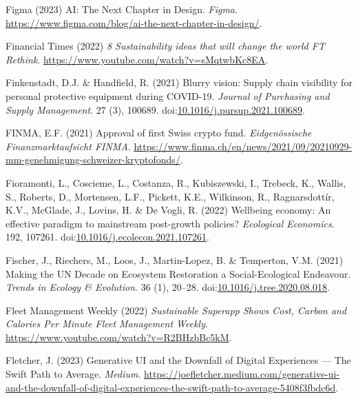 \documentclass[
  letterpaper,
  DIV=11,
  numbers=noendperiod]{scrartcl}
\newlength{\cslhangindent}
\newenvironment{CSLReferences}[2] %
 {\begin{list}{}{%
  \setlength{\itemindent}{0pt}
  \setlength{\leftmargin}{0pt}
  \setlength{\parsep}{0pt}
  \ifodd #1
   \setlength{\leftmargin}{\cslhangindent}
   \setlength{\itemindent}{-1\cslhangindent}
  \fi
  \setlength{\itemsep}{#2\baselineskip}}}
 {\end{list}}
\begin{document}
\begin{CSLReferences}{0}{1}
Figma (2023) {AI}: {The Next Chapter} in {Design}. \emph{Figma}.
\url{https://www.figma.com/blog/ai-the-next-chapter-in-design/}.

Financial Times (2022) \emph{8 {Sustainability} ideas that will change
the world {\textbar} {FT Rethink}}.
\url{https://www.youtube.com/watch?v=sMqtwbKc8EA}.

Finkenstadt, D.J. \& Handfield, R. (2021) Blurry vision: {Supply} chain
visibility for personal protective equipment during {COVID-19}.
\emph{Journal of Purchasing and Supply Management}. 27 (3), 100689.
doi:\href{https://doi.org/10.1016/j.pursup.2021.100689}{10.1016/j.pursup.2021.100689}.

FINMA, E.F. (2021) Approval of first {Swiss} crypto fund.
\emph{Eidgen{ö}ssische Finanzmarktaufsicht FINMA}.
\url{https://www.finma.ch/en/news/2021/09/20210929-mm-genehmigung-schweizer-kryptofonds/}.

Fioramonti, L., Coscieme, L., Costanza, R., Kubiszewski, I., Trebeck,
K., Wallis, S., Roberts, D., Mortensen, L.F., Pickett, K.E., Wilkinson,
R., Ragnarsdottír, K.V., McGlade, J., Lovins, H. \& De Vogli, R. (2022)
Wellbeing economy: {An} effective paradigm to mainstream post-growth
policies? \emph{Ecological Economics}. 192, 107261.
doi:\href{https://doi.org/10.1016/j.ecolecon.2021.107261}{10.1016/j.ecolecon.2021.107261}.

Fischer, J., Riechers, M., Loos, J., Martin-Lopez, B. \& Temperton, V.M.
(2021) Making the {UN Decade} on {Ecosystem Restoration} a
{Social-Ecological Endeavour}. \emph{Trends in Ecology \& Evolution}. 36
(1), 20--28.
doi:\href{https://doi.org/10.1016/j.tree.2020.08.018}{10.1016/j.tree.2020.08.018}.

Fleet Management Weekly (2022) \emph{Sustainable {Superapp Shows Cost},
{Carbon} and {Calories Per Minute} {\textbar} {Fleet Management
Weekly}}. \url{https://www.youtube.com/watch?v=R2BHzbBc5kM}.

Fletcher, J. (2023) Generative {UI} and the {Downfall} of {Digital
Experiences} --- {The Swift Path} to {Average}. \emph{Medium}.
\url{https://joefletcher.medium.com/generative-ui-and-the-downfall-of-digital-experiences-the-swift-path-to-average-5408f3fbdc6d}.


\end{CSLReferences}
\end{document}
